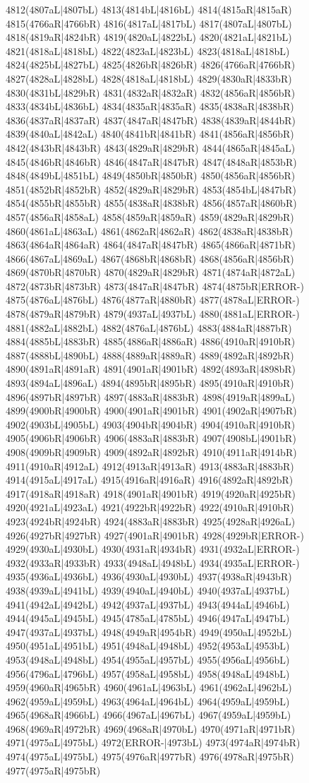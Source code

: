 4812(4807aL|4807bL) 4813(4814bL|4816bL) 4814(4815aR|4815aR) 4815(4766aR|4766bR) 4816(4817aL|4817bL) 4817(4807aL|4807bL) 4818(4819aR|4824bR) 4819(4820aL|4822bL) 4820(4821aL|4821bL) 4821(4818aL|4818bL) 4822(4823aL|4823bL) 4823(4818aL|4818bL) 4824(4825bL|4827bL) 4825(4826bR|4826bR) 4826(4766aR|4766bR) 4827(4828aL|4828bL) 4828(4818aL|4818bL) 4829(4830aR|4833bR) 4830(4831bL|4829bR) 4831(4832aR|4832aR) 4832(4856aR|4856bR) 4833(4834bL|4836bL) 4834(4835aR|4835aR) 4835(4838aR|4838bR) 4836(4837aR|4837aR) 4837(4847aR|4847bR) 4838(4839aR|4844bR) 4839(4840aL|4842aL) 4840(4841bR|4841bR) 4841(4856aR|4856bR) 4842(4843bR|4843bR) 4843(4829aR|4829bR) 4844(4865aR|4845aL) 4845(4846bR|4846bR) 4846(4847aR|4847bR) 4847(4848aR|4853bR) 4848(4849bL|4851bL) 4849(4850bR|4850bR) 4850(4856aR|4856bR) 4851(4852bR|4852bR) 4852(4829aR|4829bR) 4853(4854bL|4847bR) 4854(4855bR|4855bR) 4855(4838aR|4838bR) 4856(4857aR|4860bR) 4857(4856aR|4858aL) 4858(4859aR|4859aR) 4859(4829aR|4829bR) 4860(4861aL|4863aL) 4861(4862aR|4862aR) 4862(4838aR|4838bR) 4863(4864aR|4864aR) 4864(4847aR|4847bR) 4865(4866aR|4871bR) 4866(4867aL|4869aL) 4867(4868bR|4868bR) 4868(4856aR|4856bR) 4869(4870bR|4870bR) 4870(4829aR|4829bR) 4871(4874aR|4872aL) 4872(4873bR|4873bR) 4873(4847aR|4847bR) 4874(4875bR|ERROR-) 4875(4876aL|4876bL) 4876(4877aR|4880bR) 4877(4878aL|ERROR-) 4878(4879aR|4879bR) 4879(4937aL|4937bL) 4880(4881aL|ERROR-) 4881(4882aL|4882bL) 4882(4876aL|4876bL) 4883(4884aR|4887bR) 4884(4885bL|4883bR) 4885(4886aR|4886aR) 4886(4910aR|4910bR) 4887(4888bL|4890bL) 4888(4889aR|4889aR) 4889(4892aR|4892bR) 4890(4891aR|4891aR) 4891(4901aR|4901bR) 4892(4893aR|4898bR) 4893(4894aL|4896aL) 4894(4895bR|4895bR) 4895(4910aR|4910bR) 4896(4897bR|4897bR) 4897(4883aR|4883bR) 4898(4919aR|4899aL) 4899(4900bR|4900bR) 4900(4901aR|4901bR) 4901(4902aR|4907bR) 4902(4903bL|4905bL) 4903(4904bR|4904bR) 4904(4910aR|4910bR) 4905(4906bR|4906bR) 4906(4883aR|4883bR) 4907(4908bL|4901bR) 4908(4909bR|4909bR) 4909(4892aR|4892bR) 4910(4911aR|4914bR) 4911(4910aR|4912aL) 4912(4913aR|4913aR) 4913(4883aR|4883bR) 4914(4915aL|4917aL) 4915(4916aR|4916aR) 4916(4892aR|4892bR) 4917(4918aR|4918aR) 4918(4901aR|4901bR) 4919(4920aR|4925bR) 4920(4921aL|4923aL) 4921(4922bR|4922bR) 4922(4910aR|4910bR) 4923(4924bR|4924bR) 4924(4883aR|4883bR) 4925(4928aR|4926aL) 4926(4927bR|4927bR) 4927(4901aR|4901bR) 4928(4929bR|ERROR-) 4929(4930aL|4930bL) 4930(4931aR|4934bR) 4931(4932aL|ERROR-) 4932(4933aR|4933bR) 4933(4948aL|4948bL) 4934(4935aL|ERROR-) 4935(4936aL|4936bL) 4936(4930aL|4930bL) 4937(4938aR|4943bR) 4938(4939aL|4941bL) 4939(4940aL|4940bL) 4940(4937aL|4937bL) 4941(4942aL|4942bL) 4942(4937aL|4937bL) 4943(4944aL|4946bL) 4944(4945aL|4945bL) 4945(4785aL|4785bL) 4946(4947aL|4947bL) 4947(4937aL|4937bL) 4948(4949aR|4954bR) 4949(4950aL|4952bL) 4950(4951aL|4951bL) 4951(4948aL|4948bL) 4952(4953aL|4953bL) 4953(4948aL|4948bL) 4954(4955aL|4957bL) 4955(4956aL|4956bL) 4956(4796aL|4796bL) 4957(4958aL|4958bL) 4958(4948aL|4948bL) 4959(4960aR|4965bR) 4960(4961aL|4963bL) 4961(4962aL|4962bL) 4962(4959aL|4959bL) 4963(4964aL|4964bL) 4964(4959aL|4959bL) 4965(4968aR|4966bL) 4966(4967aL|4967bL) 4967(4959aL|4959bL) 4968(4969aR|4972bR) 4969(4968aR|4970bL) 4970(4971aR|4971bR) 4971(4975aL|4975bL) 4972(ERROR-|4973bL) 4973(4974aR|4974bR) 4974(4975aL|4975bL) 4975(4976aR|4977bR) 4976(4978aR|4975bR) 4977(4975aR|4975bR) 